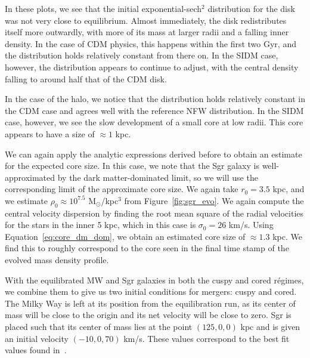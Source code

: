 In these plots, we see that the initial exponential-sech$^2$ distribution for
the disk was not very close to equilibrium. Almost immediately, the disk
redistributes itself more outwardly, with more of its mass at larger radii and a
falling inner density. In the case of CDM physics, this happens within the first
two Gyr, and the distribution holds relatively constant from there on. In the
SIDM case, however, the distribution appears to continue to adjust, with the
central density falling to around half that of the CDM disk.

In the case of the halo, we notice that the distribution holds relatively
constant in the CDM case and agrees well with the reference NFW distribution. In
the SIDM case, however, we see the slow development of a small core at low
radii. This core appears to have a size of $\approx 1$ kpc. 

We can again apply the analytic expressions derived before to obtain an
estimate for the expected core size.  In this case, we note that the Sgr
galaxy is well-approximated by the dark matter-dominated limit, so we will use
the corresponding limit of the approximate core size.  We again take $r_0 =
3.5$ kpc, and we estimate $\rho_0 \approx 10^{7.5}$ M$_\odot$/kpc$^3$ from
Figure~\ref{fig:sgr_evo}.  We again compute the central velocity dispersion by
finding the root mean square of the radial velocities for the stars in the
inner 5 kpc, which in this case is $\sigma_0 = 26$ km/s.  Using
Equation~\ref{eq:core_dm_dom}, we obtain an estimated core size of $\approx
1.3$ kpc.  We find this to roughly correspond to the core seen in the final
time stamp of the evolved mass density profile.

With the equilibrated MW and Sgr galaxies in both the cuspy and cored régimes,
we combine them to give us two initial conditions for mergers: cuspy and
cored. The Milky Way is left at its position from the equilibration run, as
its center of mass will be close to the origin and its net velocity will be
close to zero. Sgr is placed such that its center of mass lies at the point
\((125, 0, 0)\) kpc and is given an initial velocity \((-10,0,70)\) km/s.
These values correspond to the best fit values found
in~\cite{dierickx_predicted_2017}.
